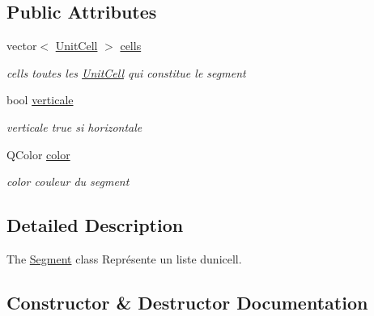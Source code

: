 \subsection*{Public Attributes}
\begin{DoxyCompactItemize}
\item 
vector$<$ \hyperlink{class_unit_cell}{Unit\+Cell} $>$ \hyperlink{class_segment_a931b5815778e37b4906f9c079432c5db}{cells}\hypertarget{class_segment_a931b5815778e37b4906f9c079432c5db}{}\label{class_segment_a931b5815778e37b4906f9c079432c5db}

\begin{DoxyCompactList}\small\item\em cells toutes les \hyperlink{class_unit_cell}{Unit\+Cell} qui constitue le segment \end{DoxyCompactList}\item 
bool \hyperlink{class_segment_a64effb3c704066934c7bfb3d5f76dead}{verticale}\hypertarget{class_segment_a64effb3c704066934c7bfb3d5f76dead}{}\label{class_segment_a64effb3c704066934c7bfb3d5f76dead}

\begin{DoxyCompactList}\small\item\em verticale true si horizontale \end{DoxyCompactList}\item 
Q\+Color \hyperlink{class_segment_ae17457fa5c481d65fa0bd6363069e144}{color}\hypertarget{class_segment_ae17457fa5c481d65fa0bd6363069e144}{}\label{class_segment_ae17457fa5c481d65fa0bd6363069e144}

\begin{DoxyCompactList}\small\item\em color couleur du segment \end{DoxyCompactList}\end{DoxyCompactItemize}


\subsection{Detailed Description}
The \hyperlink{class_segment}{Segment} class Représente un liste d\textquotesingle{}unicell. 

\subsection{Constructor \& Destructor Documentation}
